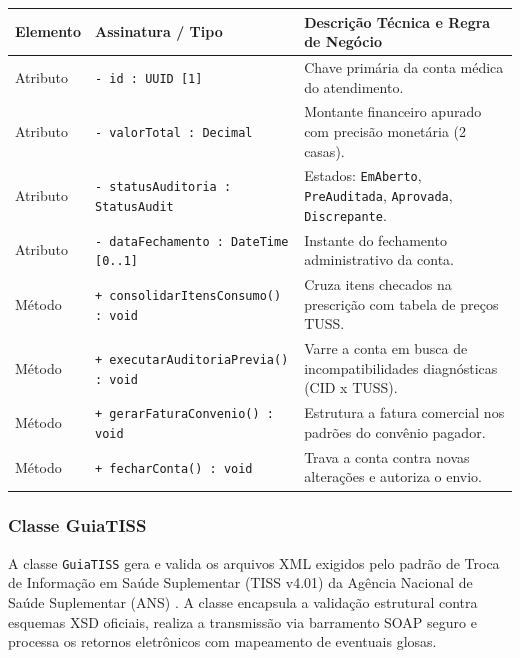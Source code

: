 \begingroup
\small
\noindent\begin{tabularx}{\linewidth}{l >{\raggedright\arraybackslash}p{5.7cm} >{\raggedright\arraybackslash}X}
\toprule
\textbf{Elemento} & \textbf{Assinatura / Tipo} & \textbf{Descrição Técnica e Regra de Negócio} \\
\midrule
Atributo & \texttt{- id : UUID [1]} & Chave primária da conta médica do atendimento. \\
Atributo & \texttt{- valorTotal : Decimal} & Montante financeiro apurado com precisão monetária (2 casas). \\
Atributo & \texttt{- statusAuditoria : StatusAudit} & Estados: \texttt{EmAberto}, \texttt{PreAuditada}, \texttt{Aprovada}, \texttt{Discrepante}. \\
Atributo & \texttt{- dataFechamento : DateTime [0..1]} & Instante do fechamento administrativo da conta. \\
\midrule
Método & \texttt{+ consolidarItensConsumo() : void} & Cruza itens checados na prescrição com tabela de preços TUSS. \\
Método & \texttt{+ executarAuditoriaPrevia() : void} & Varre a conta em busca de incompatibilidades diagnósticas (CID x TUSS). \\
Método & \texttt{+ gerarFaturaConvenio() : void} & Estrutura a fatura comercial nos padrões do convênio pagador. \\
Método & \texttt{+ fecharConta() : void} & Trava a conta contra novas alterações e autoriza o envio. \\
\bottomrule
\end{tabularx}
\endgroup

\subsubsection{Classe GuiaTISS}
A classe \texttt{GuiaTISS} gera e valida os arquivos XML exigidos pelo padrão de Troca de Informação em Saúde Suplementar (TISS v4.01) da Agência Nacional de Saúde Suplementar (ANS) \cite{ans_tiss:2023}. A classe encapsula a validação estrutural contra esquemas XSD oficiais, realiza a transmissão via barramento SOAP seguro e processa os retornos eletrônicos com mapeamento de eventuais glosas.


